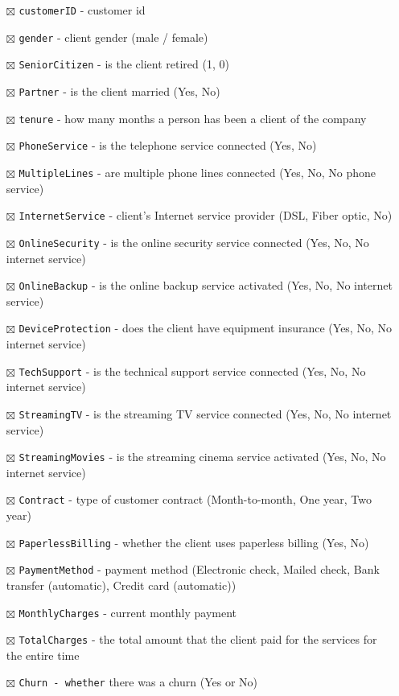 \documentclass[
]{book}
\providecommand{\tightlist}{%
  \setlength{\itemsep}{0pt}\setlength{\parskip}{0pt}}
\begin{document}
\begin{itemize}
\tightlist
\item[$\boxtimes$]
  \texttt{customerID} - customer id
\item[$\boxtimes$]
  \texttt{gender} - client gender (male / female)
\item[$\boxtimes$]
  \texttt{SeniorCitizen} - is the client retired (1, 0)
\item[$\boxtimes$]
  \texttt{Partner} - is the client married (Yes, No)
\item[$\boxtimes$]
  \texttt{tenure} - how many months a person has been a client of the company
\item[$\boxtimes$]
  \texttt{PhoneService} - is the telephone service connected (Yes, No)
\item[$\boxtimes$]
  \texttt{MultipleLines} - are multiple phone lines connected (Yes, No, No phone service)
\item[$\boxtimes$]
  \texttt{InternetService} - client's Internet service provider (DSL, Fiber optic, No)
\item[$\boxtimes$]
  \texttt{OnlineSecurity} - is the online security service connected (Yes, No, No internet service)
\item[$\boxtimes$]
  \texttt{OnlineBackup} - is the online backup service activated (Yes, No, No internet service)
\item[$\boxtimes$]
  \texttt{DeviceProtection} - does the client have equipment insurance (Yes, No, No internet service)
\item[$\boxtimes$]
  \texttt{TechSupport} - is the technical support service connected (Yes, No, No internet service)
\item[$\boxtimes$]
  \texttt{StreamingTV} - is the streaming TV service connected (Yes, No, No internet service)
\item[$\boxtimes$]
  \texttt{StreamingMovies} - is the streaming cinema service activated (Yes, No, No internet service)
\item[$\boxtimes$]
  \texttt{Contract} - type of customer contract (Month-to-month, One year, Two year)
\item[$\boxtimes$]
  \texttt{PaperlessBilling} - whether the client uses paperless billing (Yes, No)
\item[$\boxtimes$]
  \texttt{PaymentMethod} - payment method (Electronic check, Mailed check, Bank transfer (automatic), Credit card (automatic))
\item[$\boxtimes$]
  \texttt{MonthlyCharges} - current monthly payment
\item[$\boxtimes$]
  \texttt{TotalCharges} - the total amount that the client paid for the services for the entire time
\item[$\boxtimes$]
  \texttt{Churn\ -\ whether} there was a churn (Yes or No)
\end{itemize}
\end{document}
